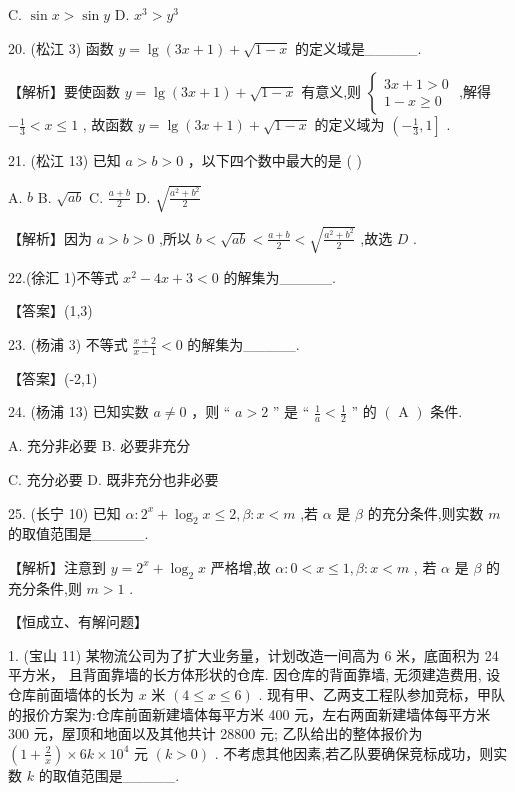 \documentclass[10pt]{article}
\begin{document}
C. \(\sin x > \sin y\) D. \({x}^{3} > {y}^{3}\)

20. (松江 3) 函数 \(y = \lg \left( {{3x} + 1}\right)  + \sqrt{1 - x}\) 的定义域是\_\_\_\_\_.

【解析】要使函数 \(y = \lg \left( {{3x} + 1}\right)  + \sqrt{1 - x}\) 有意义,则 \(\left\{  \begin{array}{l} {3x} + 1 > 0 \\  1 - x \geq  0 \end{array}\right.\) ,解得 \(- \frac{1}{3} < x \leq  1\) , 故函数 \(y = \lg \left( {{3x} + 1}\right)  + \sqrt{1 - x}\) 的定义域为 \(\left( {-\frac{1}{3},1}\right\rbrack\) .

21. (松江 13) 已知 \(a > b > 0\) ，以下四个数中最大的是 ( )

A. \(b\) B. \(\sqrt{ab}\) C. \(\frac{a + b}{2}\) D. \(\sqrt{\frac{{a}^{2} + {b}^{2}}{2}}\)

【解析】因为 \(a > b > 0\) ,所以 \(b < \sqrt{ab} < \frac{a + b}{2} < \sqrt{\frac{{a}^{2} + {b}^{2}}{2}}\) ,故选 \(D\) .

22.(徐汇 1)不等式 \({x}^{2} - {4x} + 3 < 0\) 的解集为\_\_\_\_\_.

【答案】(1,3)

23. (杨浦 3) 不等式 \(\frac{x + 2}{x - 1} < 0\) 的解集为\_\_\_\_\_.

【答案】(-2,1)

24. (杨浦 13) 已知实数 \(a \neq  0\) ，则 “ \(a > 2\) ” 是 “ \(\frac{1}{a} < \frac{1}{2}\) ” 的 \(\left( {\text{ A }  }\right)\) 条件.

A. 充分非必要 B. 必要非充分

C. 充分必要 D. 既非充分也非必要

25. (长宁 10) 已知 \(\alpha  : {2}^{x} + {\log }_{2}x \leq  2,\beta  : x < m\) ,若 \(\alpha\) 是 \(\beta\) 的充分条件,则实数 \(m\) 的取值范围是\_\_\_\_\_.

【解析】注意到 \(y = {2}^{x} + {\log }_{2}x\) 严格增,故 \(\alpha  : 0 < x \leq  1,\beta  : x < m\) , 若 \(\alpha\) 是 \(\beta\) 的充分条件,则 \(m > 1\) .

【恒成立、有解问题】

1. (宝山 11) 某物流公司为了扩大业务量，计划改造一间高为 6 米，底面积为 24 平方米， 且背面靠墙的长方体形状的仓库. 因仓库的背面靠墙, 无须建造费用, 设仓库前面墙体的长为 \(x\) 米 \(\left( {4 \leq  x \leq  6}\right)\) . 现有甲、乙两支工程队参加竞标，甲队的报价方案为:仓库前面新建墙体每平方米 400 元，左右两面新建墙体每平方米 300 元，屋顶和地面以及其他共计 28800 元; 乙队给出的整体报价为 \(\left( {1 + \frac{2}{x}}\right)  \times  {6k} \times  {10}^{4}\) 元 \(\left( {k > 0}\right)\) . 不考虑其他因素,若乙队要确保竞标成功，则实数 \(k\) 的取值范围是\_\_\_\_\_.
\end{document}
